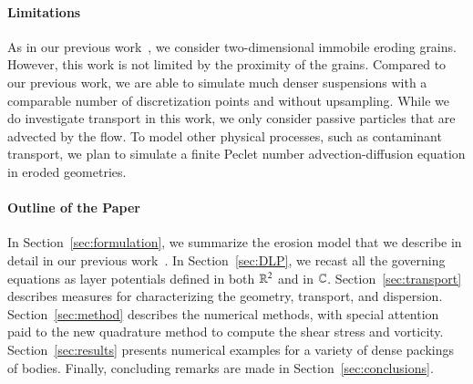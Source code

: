 \documentclass[preprint,10pt]{elsarticle}
\begin{document}
\paragraph{Limitations}
As in our previous work~\cite{qua-moo2018}, we consider two-dimensional
immobile eroding grains. However, this work is not limited by the
proximity of the grains. Compared to our previous work, we are able to
simulate much denser suspensions with a comparable number of
discretization points and without upsampling.  While we do investigate
transport in this work, we only consider passive particles that are
advected by the flow.  To model other physical processes, such as
contaminant transport, we plan to simulate a finite Peclet number
advection-diffusion equation in eroded geometries.


\paragraph{Outline of the Paper}
In Section~\ref{sec:formulation}, we summarize the erosion model that we
describe in detail in our previous work~\cite{qua-moo2018}.  In
Section~\ref{sec:DLP}, we recast all the governing equations as layer
potentials defined in both ${\mathbb{R}}^2$ and in ${\mathbb{C}}$.
Section~\ref{sec:transport} describes measures for characterizing the
geometry, transport, and dispersion. Section~\ref{sec:method} describes
the numerical methods, with special attention paid to the new quadrature
method to compute the shear stress and vorticity.
Section~\ref{sec:results} presents numerical examples for a variety of
dense packings of bodies.  Finally, concluding remarks are made in
Section~\ref{sec:conclusions}.

\end{document}
